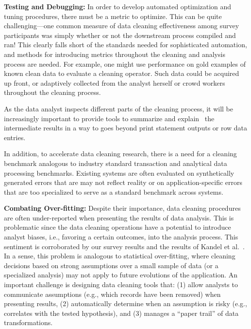 \vspace{0.5em}
\noindent\textbf{Testing and Debugging:} In order to develop automated optimization and tuning procedures, there must be a metric to optimize.  This can be quite challenging---one common measure of data cleaning effectiveness among survey participants was simply whether or not the downstream process compiled and ran!
This clearly falls short of the standards needed for sophisticated automation, and methods for introducing metrics throughout the cleaning and analysis process are needed.
For example, one might use performance on gold examples of known clean data to evaluate a cleaning operator.
Such data could be acquired up front, or adaptively collected from the analyst herself or crowd workers throughout the cleaning process.

As the data analyst inspects different parts of the cleaning process, it will be increasingly important to provide tools to summarize and explain~\cite{DBLP:journals/pvldb/0002M13,DBLP:conf/sigmod/ChalamallaIOP14,wang2016qfix} the intermediate results in a way to goes beyond print statement outputs or row data entries.

In addition, to accelerate data cleaning research, there is a need for a cleaning benchmark analogous to industry standard transaction and analytical data processing benchmarks.
Existing systems are often evaluated on synthetically generated errors that are may not reflect reality or on application-specific errors that are too specialized to serve as a standard benchmark across systems.

\vspace{0.5em}
\noindent\textbf{Combating Over-fitting:}
Despite their importance, data cleaning procedures are often under-reported
when presenting the results of data analysis. This is problematic since the data
cleaning operations have a potential to introduce analyst biases,
i.e., favoring a certain outcomes, into the analysis process.
This sentiment is corroborated by our survey results and the results of Kandel et al.~\cite{kandel2012}.
In a sense, this problem is analogous to statistical over-fitting, where cleaning decisions based on strong assumptions over a small sample of data (or a specialized analysis) may not apply to future evolutions of the application.
An important challenge is designing data cleaning tools that: (1) allow analysts to communicate assumptions (e.g., which records have been removed) when presenting results, (2) automatically determine when an assumption is risky (e.g., correlates with the tested hypothesis), and (3) manages a ``paper trail'' of data transformations.


